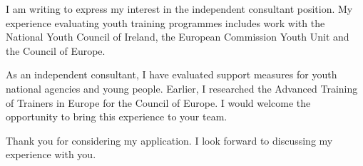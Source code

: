 \documentclass[english,color-default]{europassletter2025}
\begin{document}
\begin{eclletter}
I am writing to express my interest in the independent consultant position.
My experience evaluating youth training programmes includes work with the
National Youth Council of Ireland, the European Commission Youth Unit and the
Council of Europe.

As an independent consultant, I have evaluated support measures for youth
national agencies and young people. Earlier, I researched the Advanced
Training of Trainers in Europe for the Council of Europe. I would welcome the
opportunity to bring this experience to your team.

Thank you for considering my application. I look forward to discussing my
experience with you.
\end{eclletter}
\end{document}
